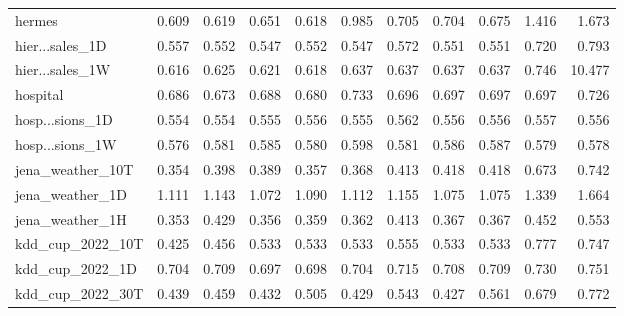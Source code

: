 {\begin{longtable}{@{}p{2.2cm}@{\hspace{6pt}}rrrrrrrrrr@{}}
\ttfamily\scriptsize hermes & \cellcolor{medalGold}0.609 & \cellcolor{medalBronze}0.619 & 0.651 & \cellcolor{medalSilver}0.618 & 0.985 & 0.705 & 0.704 & 0.675 & 1.416 & 1.673 \\
\ttfamily\scriptsize hier...sales\_1D & 0.557 & 0.552 & \cellcolor{medalSilver}0.547 & 0.552 & \cellcolor{medalGold}0.547 & 0.572 & \cellcolor{medalBronze}0.551 & 0.551 & 0.720 & 0.793 \\
\ttfamily\scriptsize hier...sales\_1W & \cellcolor{medalGold}0.616 & 0.625 & \cellcolor{medalBronze}0.621 & \cellcolor{medalSilver}0.618 & 0.637 & 0.637 & 0.637 & 0.637 & 0.746 & 10.477 \\
\ttfamily\scriptsize hospital & \cellcolor{medalBronze}0.686 & \cellcolor{medalGold}0.673 & 0.688 & \cellcolor{medalSilver}0.680 & 0.733 & 0.696 & 0.697 & 0.697 & 0.697 & 0.726 \\
\ttfamily\scriptsize hosp...sions\_1D & \cellcolor{medalSilver}0.554 & \cellcolor{medalGold}0.554 & \cellcolor{medalBronze}0.555 & 0.556 & 0.555 & 0.562 & 0.556 & 0.556 & 0.557 & 0.556 \\
\ttfamily\scriptsize hosp...sions\_1W & \cellcolor{medalGold}0.576 & 0.581 & 0.585 & 0.580 & 0.598 & 0.581 & 0.586 & 0.587 & \cellcolor{medalBronze}0.579 & \cellcolor{medalSilver}0.578 \\
\ttfamily\scriptsize jena\_weather\_10T & \cellcolor{medalGold}0.354 & 0.398 & 0.389 & \cellcolor{medalSilver}0.357 & \cellcolor{medalBronze}0.368 & 0.413 & 0.418 & 0.418 & 0.673 & 0.742 \\
\ttfamily\scriptsize jena\_weather\_1D & 1.111 & 1.143 & \cellcolor{medalGold}1.072 & 1.090 & 1.112 & 1.155 & \cellcolor{medalSilver}1.075 & \cellcolor{medalBronze}1.075 & 1.339 & 1.664 \\
\ttfamily\scriptsize jena\_weather\_1H & \cellcolor{medalGold}0.353 & 0.429 & \cellcolor{medalSilver}0.356 & \cellcolor{medalBronze}0.359 & 0.362 & 0.413 & 0.367 & 0.367 & 0.452 & 0.553 \\
\ttfamily\scriptsize kdd\_cup\_2022\_10T & \cellcolor{medalGold}0.425 & \cellcolor{medalSilver}0.456 & \cellcolor{medalBronze}0.533 & 0.533 & 0.533 & 0.555 & 0.533 & 0.533 & 0.777 & 0.747 \\
\ttfamily\scriptsize kdd\_cup\_2022\_1D & \cellcolor{medalBronze}0.704 & 0.709 & \cellcolor{medalGold}0.697 & \cellcolor{medalSilver}0.698 & 0.704 & 0.715 & 0.708 & 0.709 & 0.730 & 0.751 \\
\ttfamily\scriptsize kdd\_cup\_2022\_30T & 0.439 & 0.459 & \cellcolor{medalBronze}0.432 & 0.505 & \cellcolor{medalSilver}0.429 & 0.543 & \cellcolor{medalGold}0.427 & 0.561 & 0.679 & 0.772 \\

\end{longtable}}
